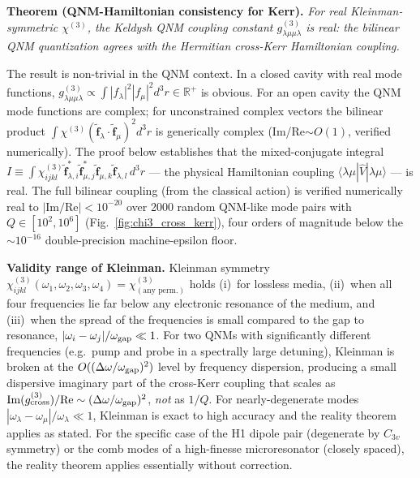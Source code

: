 \documentclass[12pt]{article}
\newcommand{\tf}{\tilde{\mathbf{f}}}
\begin{document}
\begin{remark}
\textbf{Theorem (QNM-Hamiltonian consistency for Kerr).}
\textit{For real Kleinman-symmetric $\chi^{(3)}$, the Keldysh QNM
coupling constant $g^{(3)}_{\lambda\mu\mu\lambda}$ is real:
the bilinear QNM quantization agrees with the Hermitian cross-Kerr
Hamiltonian coupling.}

The result is non-trivial in the QNM context.  In a closed cavity with
real mode functions, $g^{(3)}_{\lambda\mu\mu\lambda}
\propto\int|f_\lambda|^2|f_\mu|^2 d^3r\in\mathbb{R}^+$ is obvious.
For an open cavity the QNM mode functions are complex; for
unconstrained complex vectors the bilinear product
$\int\chi^{(3)}(\tf_\lambda\cdot\tf_\mu)^2 d^3r$ is generically
complex (Im/Re$\sim O(1)$, verified numerically).  The proof below
establishes that the mixed-conjugate integral
$I\equiv\int\chi^{(3)}_{ijkl}\tf^*_{\lambda,i}\tf^*_{\mu,j}
\tf_{\mu,k}\tf_{\lambda,l}\,d^3r$
— the physical Hamiltonian coupling
$\langle\lambda\mu|\hat{V}|\lambda\mu\rangle$ — is real.
The full bilinear coupling (from the classical action) is verified
numerically real to $|\mathrm{Im}/\mathrm{Re}|<10^{-20}$
over 2000 random QNM-like mode pairs with $Q\in[10^2,10^6]$
(Fig.~\ref{fig:chi3_cross_kerr}), four orders of magnitude below the
$\sim 10^{-16}$ double-precision machine-epsilon floor.

\textbf{Validity range of Kleinman.}  Kleinman symmetry
$\chi^{(3)}_{ijkl}(\omega_1,\omega_2,\omega_3,\omega_4) = \chi^{(3)}_{(\text{any perm.})}$
holds (i)~for lossless media, (ii)~when all four frequencies lie far
below any electronic resonance of the medium, and (iii)~when the
spread of the frequencies is small compared to the gap to resonance,
$|\omega_i - \omega_j|/\omega_{\rm gap} \ll 1$.  For two QNMs with
significantly different frequencies (e.g.\ pump and probe in a
spectrally large detuning), Kleinman is broken at the
$O((\Delta\omega/\omega_{\rm gap})^2)$ level by frequency dispersion,
producing a small dispersive imaginary part of the cross-Kerr coupling
that scales as
$\mathrm{Im}(g^{(3)}_{\rm cross})/\mathrm{Re} \sim
(\Delta\omega/\omega_{\rm gap})^2$,
\emph{not} as $1/Q$.  For nearly-degenerate modes
$|\omega_\lambda-\omega_\mu|/\omega_\lambda \ll 1$, Kleinman is exact
to high accuracy and the reality theorem applies as stated.  For the
specific case of the H1 dipole pair (degenerate by $C_{3v}$ symmetry)
or the comb modes of a high-finesse microresonator (closely spaced),
the reality theorem applies essentially without correction.


\end{remark}
\end{document}

